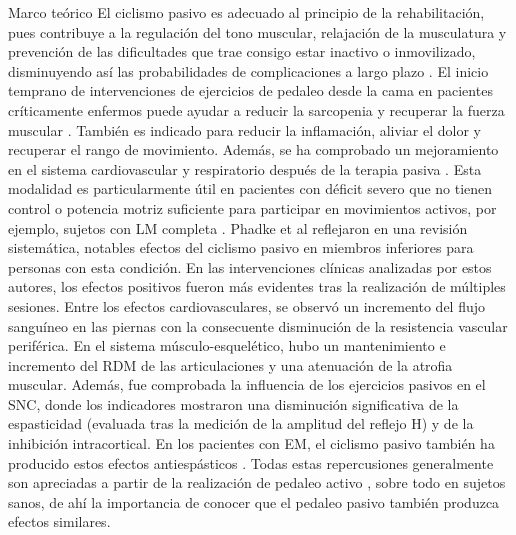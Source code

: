 \begin{thesischapter}{1} {Marco teórico}
    \vspace{5pt}
    El ciclismo pasivo es adecuado al principio de la rehabilitación, pues contribuye a la regulación del tono muscular, relajación de la musculatura y prevención de las dificultades que trae consigo estar inactivo o inmovilizado, disminuyendo así las probabilidades de complicaciones a largo plazo \cite{cruz2009guia}. El inicio temprano de intervenciones de ejercicios de pedaleo desde la cama en pacientes críticamente enfermos puede ayudar a reducir la sarcopenia y recuperar la fuerza muscular \cite{nickels2020acceptability}. También es indicado para reducir la inflamación, aliviar el dolor y recuperar el rango de movimiento. Además, se ha comprobado un mejoramiento en el sistema cardiovascular y respiratorio después de la terapia pasiva \cite{cruz2009guia, phadke2019impact}. Esta modalidad es particularmente útil en pacientes con déficit severo que no tienen control o potencia motriz suficiente para participar en movimientos activos, por ejemplo,
    sujetos con LM completa \cite{phadke2019impact, nardone2017passive}. Phadke et al \cite{phadke2019impact} reflejaron en una revisión sistemática, notables efectos del ciclismo pasivo en miembros inferiores para personas con esta condición. En las intervenciones clínicas analizadas por estos autores, los efectos positivos fueron más evidentes tras la realización de múltiples sesiones. Entre los efectos cardiovasculares, se observó un incremento del flujo sanguíneo en las piernas con la consecuente disminución de la resistencia vascular periférica. En el sistema músculo-esquelético, hubo un mantenimiento e incremento del RDM de las articulaciones y una atenuación de la atrofia muscular. Además, fue comprobada la influencia de los ejercicios pasivos en el SNC, donde los indicadores mostraron una disminución significativa de la espasticidad (evaluada tras la medición de la amplitud del reflejo H) y de la inhibición intracortical. En los pacientes con EM, el ciclismo pasivo también ha producido estos efectos antiespásticos \cite{motl2006effect, guyot2012effects}. Todas estas repercusiones generalmente
    son apreciadas a partir de la realización de pedaleo activo \cite{nardone2016effects}, sobre todo en sujetos sanos, de ahí la importancia de conocer que el pedaleo pasivo también produzca efectos similares.


\end{thesischapter}
